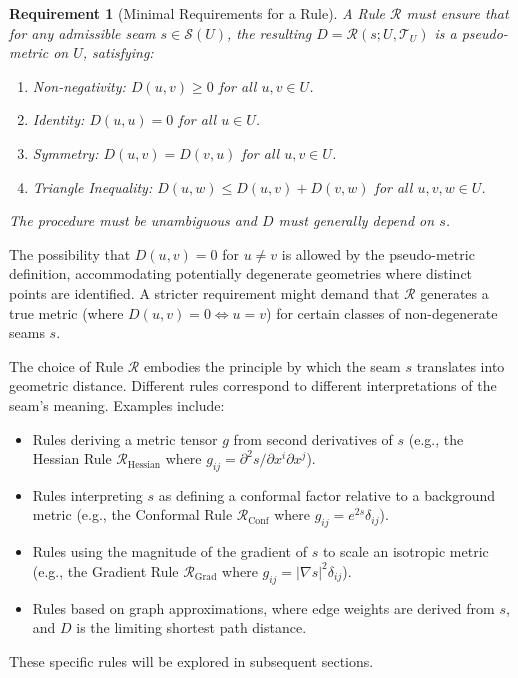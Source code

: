 \documentclass[twoside,twocolumn]{article}
\newtheorem{requirement}{Requirement}[definition]
\begin{document}
\begin{requirement}[Minimal Requirements for a Rule]\label{req:RuleReqs}
A Rule \( \mathcal{R} \) must ensure that for any admissible seam \( s \in \mathcal{S}(U) \), the resulting \( D = \mathcal{R}(s; U, \mathcal{T}_U) \) is a pseudo-metric on \( U \), satisfying:
\begin{enumerate}[label=(M\arabic*)]
\item \textit{Non-negativity:} \( D(u, v) \ge 0 \) for all \( u, v \in U \).
\item \textit{Identity:} \( D(u, u) = 0 \) for all \( u \in U \).
\item \textit{Symmetry:} \( D(u, v) = D(v, u) \) for all \( u, v \in U \).
\item \textit{Triangle Inequality:} \( D(u, w) \le D(u, v) + D(v, w) \) for all \( u, v, w \in U \).
\end{enumerate}
The procedure must be unambiguous and \( D \) must generally depend on \( s \).
\end{requirement}

\noindent The possibility that $D(u, v) = 0$ for $u \neq v$ is allowed by the pseudo-metric definition, accommodating potentially degenerate geometries where distinct points are identified. A stricter requirement might demand that $\mathcal{R}$ generates a true metric (where $D(u, v) = 0 \iff u=v$) for certain classes of non-degenerate seams $s$.

The choice of Rule $\mathcal{R}$ embodies the principle by which the seam $s$ translates into geometric distance. Different rules correspond to different interpretations of the seam's meaning. Examples include:
\begin{itemize}
    \item Rules deriving a metric tensor $g$ from second derivatives of $s$ (e.g., the Hessian Rule $\mathcal{R}_{\text{Hessian}}$ where $g_{ij} = \partial^2 s / \partial x^i \partial x^j$).
    \item Rules interpreting $s$ as defining a conformal factor relative to a background metric (e.g., the Conformal Rule $\mathcal{R}_{\text{Conf}}$ where $g_{ij} = e^{2s} \delta_{ij}$).
    \item Rules using the magnitude of the gradient of $s$ to scale an isotropic metric (e.g., the Gradient Rule \( \mathcal{R}_{\text{Grad}} \) where \( g_{ij} = |\nabla s|^2 \delta_{ij} \)). %
    \item Rules based on graph approximations, where edge weights are derived from $s$, and $D$ is the limiting shortest path distance.
\end{itemize}
These specific rules will be explored in subsequent sections.
\end{document}
